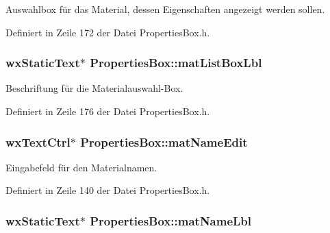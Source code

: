 Auswahlbox für das Material, dessen Eigenschaften angezeigt werden sollen. 



Definiert in Zeile 172 der Datei Properties\-Box.\-h.

\hypertarget{classPropertiesBox_aa08a220302b1d89a196dc7e03a390bd6}{
\subsubsection[{mat\-List\-Box\-Lbl}]{\setlength{\rightskip}{0pt plus 5cm}wx\-Static\-Text$\ast$ Properties\-Box\-::mat\-List\-Box\-Lbl\hspace{0.3cm}{\ttfamily [private]}}}\label{classPropertiesBox_aa08a220302b1d89a196dc7e03a390bd6}


Beschriftung für die Materialauswahl-\/\-Box. 



Definiert in Zeile 176 der Datei Properties\-Box.\-h.

\hypertarget{classPropertiesBox_aba989cc01ddce5251f021419bfe3408f}{
\subsubsection[{mat\-Name\-Edit}]{\setlength{\rightskip}{0pt plus 5cm}wx\-Text\-Ctrl$\ast$ Properties\-Box\-::mat\-Name\-Edit\hspace{0.3cm}{\ttfamily [private]}}}\label{classPropertiesBox_aba989cc01ddce5251f021419bfe3408f}


Eingabefeld für den Materialnamen. 



Definiert in Zeile 140 der Datei Properties\-Box.\-h.

\hypertarget{classPropertiesBox_ae07827304c19b4e71532fed5a4c65bb0}{
\subsubsection[{mat\-Name\-Lbl}]{\setlength{\rightskip}{0pt plus 5cm}wx\-Static\-Text$\ast$ Properties\-Box\-::mat\-Name\-Lbl\hspace{0.3cm}{\ttfamily [private]}}}\label{classPropertiesBox_ae07827304c19b4e71532fed5a4c65bb0}



